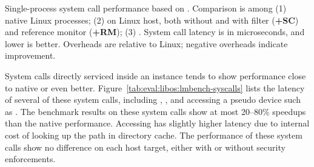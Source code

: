 \label{sec:eval:libos:syscalls}


\begin{table}[t!b!]

\caption{Single-process system call performance based on \lmbench{}. Comparison is among (1) native Linux processes; (2) \graphene{} on Linux host, both without and with \seccomp{} filter ({\bf +SC}) and reference monitor ({\bf +RM}); (3) \graphenesgx{}.
System call latency is in microseconds, and lower is better.
Overheads are relative to Linux; negative overheads indicate improvement.} 
\label{tab:eval:libos:lmbench-syscalls}
\end{table}


System calls directly serviced
inside an \thelibos{} instance tends to show performance
close to native or even better.
Figure~\ref{tab:eval:libos:lmbench-syscalls}
lists the latency of several of these system calls,
including ,
, and accessing a pseudo device such as .
The benchmark results on these system calls
show at most 20--80\% speedups
than the native performance.
Accessing  has slightly higher latency
due to internal cost of looking up
the path in directory cache.
The performance of these system calls show no difference
on each host target, either with or without security enforcements.






